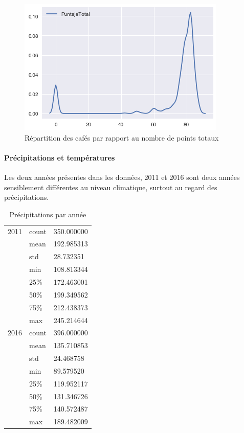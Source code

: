 \begin{figure}[H]
	\centering
	\includegraphics[width=0.7\linewidth]{img/Exploration/kdeplotPuntajeTotal}
	\caption{Répartition des cafés par rapport au nombre de points totaux}
	\label{fig:kdeplotpuntajetotal}
\end{figure}



\newpage
\paragraph{Précipitations et températures} Les deux années présentes dans les données, 2011 et 2016 sont deux années sensiblement différentes au niveau climatique, surtout au regard des précipitations.  

\begin{table}[H]
	\centering
	\caption{Précipitations par année}
	\label{YearlyPrec1}
	\begin{tabular}{lll}
		2011 & count                               & 350.000000 \\
		&mean & 192.985313                                      \\
		&std  & 28.732351                                       \\
		&min  & 108.813344                                     \\
		&25\% & 172.463001                                     \\
		&50\% & 199.349562                                      \\
		&75\% & 212.438373                                      \\
		&max  & 245.214644                                      \\
	2016 & count                               & 396.000000 \\
		&mean & 135.710853                                      \\
		&std  & 24.468758                                      \\
		&min  & 89.579520                                       \\
		&25\% & 119.952117                                      \\
		&50\% & 131.346726                                      \\
		&75\% & 140.572487                                      \\
		&max  & 189.482009                   
	\end{tabular}
\end{table}


